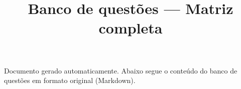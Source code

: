 \documentclass[11pt]{article}
\title{Banco de questões — Matriz completa}
\date{}
\begin{document}
\maketitle
\noindent Documento gerado automaticamente. Abaixo segue o conteúdo do banco de questões em formato original (Markdown).
\bigskip
{}
\end{document}
